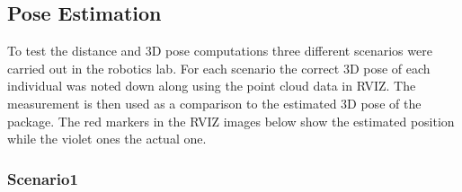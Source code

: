 \subsection{Pose Estimation}

To test the distance and 3D pose computations three different scenarios were carried out in the robotics lab. For each scenario the correct 3D pose of each individual was noted down along using the point cloud data in RVIZ. The measurement is then used as a comparison to the estimated 3D pose of the package. The red markers in the RVIZ images below show the estimated position while the violet ones the actual one.

\subsubsection{Scenario1}

